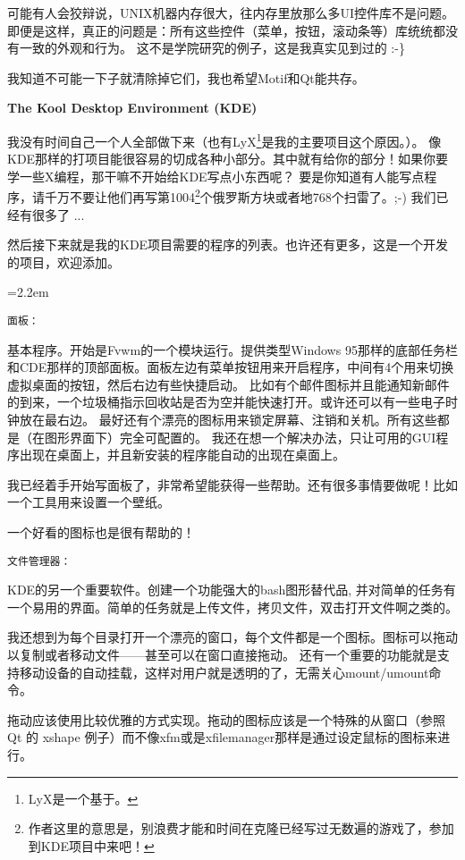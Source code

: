 \documentclass[amstex,twoside]{ctexbook}
\newenvironment{insertnote}{ \ttfamily\CJKfamily{KaiTi} }{\vskip 0.5cm }
\begin{document}
\begin{insertnote}
可能有人会狡辩说，UNIX机器内存很大，往内存里放那么多UI控件库不是问题。即便是这样，真正的问题是：所有这些控件（菜单，按钮，滚动条等）库统统都没有一致的外观和行为。
这不是学院研究的例子，这是我真实见到过的 :-\}

我知道不可能一下子就清除掉它们，我也希望Motif和Qt能共存。


{\large \noindent \bf The Kool Desktop Environment (KDE)}

我没有时间自己一个人全部做下来（也有LyX\footnote{LyX是一个基于。}是我的主要项目这个原因。）。
像KDE那样的打项目能很容易的切成各种小部分。其中就有给你的部分！如果你要学一些X编程，那干嘛不开始给KDE写点小东西呢？
要是你知道有人能写点程序，请千万不要让他们再写第1004\footnote{作者这里的意思是，别浪费才能和时间在克隆已经写过无数遍的游戏了，参加到KDE项目中来吧！}个俄罗斯方块或者地768个扫雷了。;-) 我们已经有很多了 ... 

然后接下来就是我的KDE项目需要的程序的列表。也许还有更多，这是一个开发的项目，欢迎添加。

{
\leftskip=2.2em
\small 

{\noindent \tt 面板：}

    基本程序。开始是Fvwm的一个模块运行。提供类型Windows 95那样的底部任务栏和CDE那样的顶部面板。面板左边有菜单按钮用来开启程序，中间有4个用来切换虚拟桌面的按钮，然后右边有些快捷启动。
    比如有个邮件图标并且能通知新邮件的到来，一个垃圾桶指示回收站是否为空并能快速打开。或许还可以有一些电子时钟放在最右边。
    最好还有个漂亮的图标用来锁定屏幕、注销和关机。所有这些都是（在图形界面下）完全可配置的。
    我还在想一个解决办法，只让可用的GUI程序出现在桌面上，并且新安装的程序能自动的出现在桌面上。

    我已经着手开始写面板了，非常希望能获得一些帮助。还有很多事情要做呢！比如一个工具用来设置一个壁纸。
    
    一个好看的图标也是很有帮助的！

{ \noindent \tt 文件管理器：}

    KDE的另一个重要软件。创建一个功能强大的bash图形替代品, 并对简单的任务有一个易用的界面。简单的任务就是上传文件，拷贝文件，双击打开文件啊之类的。

    我还想到为每个目录打开一个漂亮的窗口，每个文件都是一个图标。图标可以拖动以复制或者移动文件——甚至可以在窗口直接拖动。
    还有一个重要的功能就是支持移动设备的自动挂载，这样对用户就是透明的了，无需关心mount/umount命令。

    拖动应该使用比较优雅的方式实现。拖动的图标应该是一个特殊的从窗口（参照 Qt 的 xshape 例子）而不像xfm或是xfilemanager那样是通过设定鼠标的图标来进行。

}
\end{insertnote}
\end{document}
